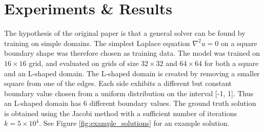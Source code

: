 \section{Experiments \& Results}

The hypothesis of the original paper is that a general solver can be found by training on simple domains. The simplest Laplace equation $\nabla^2u = 0$ on a square boundary shape was therefore chosen as training data.
The model was trained on $16\times16$ grid, and evaluated on grids of size $32\times32$ and $64\times64$ for both a square and an L-shaped domain. 
The L-shaped domain is created by removing a smaller square from one of the edges. Each side exhibits a different but constant boundary value chosen from a uniform distribution on the interval [-1, 1]. Thus an L-shaped domain has 6 different boundary values. The ground truth solution is obtained using the Jacobi method with a sufficient number of iterations $k=5\times10^4$. See Figure \ref{fig:example_solutions} for an example solution.

